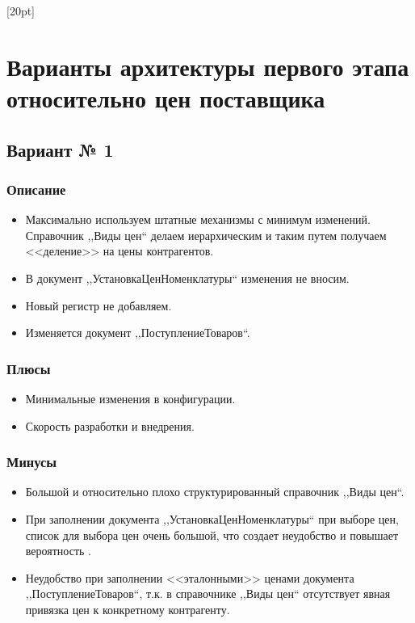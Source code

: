 [20pt]
\section{Варианты архитектуры первого этапа относительно цен поставщика}
\subsection{Вариант № 1}
\reversemarginpar
{}
\subsubsection  {Описание} 
\begin {itemize}	

\item Максимально используем штатные механизмы с минимум изменений. Справочник ,,Виды цен`` делаем иерархическим и таким путем получаем <<деление>> на цены контрагентов.
\item В документ ,,УстановкаЦенНоменклатуры`` изменения не вносим.
\item Новый регистр не добавляем.
\item Изменяется документ ,,ПоступлениеТоваров``.
\end{itemize}

\subsubsection{Плюсы}
\begin{itemize}	
\item Минимальные изменения в конфигурации.
\item Скорость разработки и внедрения.
\end{itemize}
\subsubsection{Минусы}
\begin{itemize}	
\item Большой и относительно плохо структурированный справочник ,,Виды цен``.
\item  При заполнении документа ,,УстановкаЦенНоменклатуры`` при выборе цен, список для выбора цен очень большой,
что создает неудобство и повышает вероятность .
\item Неудобство при заполнении <<эталонными>> ценами документа ,,ПоступлениеТоваров``, т.к. в справочнике ,,Виды цен`` отсутствует явная привязка цен к конкретному контрагенту.	
\end{itemize}

